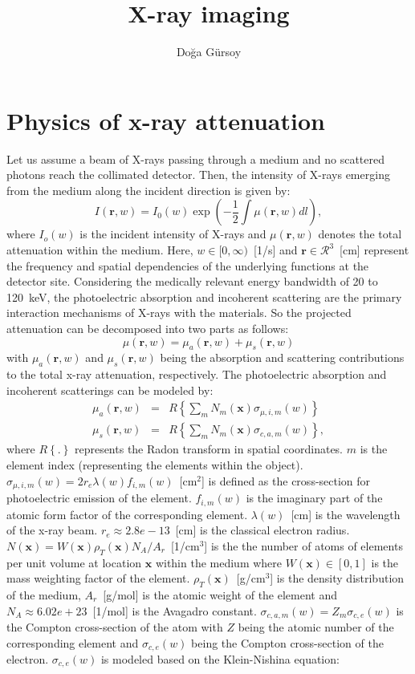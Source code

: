 \documentclass[12pt]{article}
\title{X-ray imaging}
\author{Do\u{g}a G\"{u}rsoy}
\begin{document}
\maketitle
\section{Physics of x-ray attenuation}
Let us assume a beam of X-rays passing through a medium and no scattered photons reach the collimated detector. Then, the intensity of X-rays emerging from the medium along the incident direction is given by:
\begin{equation}
 I(\textbf{r},w) = I_0(w)\exp\left(-\frac{1}{2}\int\mu(\textbf{r},w)dl\right),
 \label{intensity}
\end{equation}
where $I_o(w)$ is the incident intensity of X-rays and $\mu(\textbf{r},w)$ denotes the total attenuation within the medium. Here, $w\in[0,\infty)$~[1/s] and $\textbf{r}\in\mathcal{R}^3$~[cm] represent the frequency and spatial dependencies of the underlying functions at the detector site. Considering the medically relevant energy bandwidth of 20 to 120~keV, the photoelectric absorption and incoherent scattering are the primary interaction mechanisms of X-rays with the materials. So the projected attenuation can be decomposed into two parts as follows:
\begin{equation}
 \mu(\textbf{r},w) = \mu_{a}(\textbf{r},w)+\mu_{s}(\textbf{r},w)
 \label{attenuation}
\end{equation}
with $\mu_{a}(\textbf{r},w)$ and $\mu_{s}(\textbf{r},w)$ being the absorption and scattering contributions to the total x-ray attenuation, respectively. The photoelectric absorption and incoherent scatterings can be modeled by:
\begin{eqnarray}
 \mu_a(\textbf{r},w) &=& R\left\lbrace\sum_m N_m(\textbf{x})\sigma_{\mu,i,m}(w)\right\rbrace \label{absorption} \\
 \mu_s(\textbf{r},w) &=& R\left\lbrace\sum_m N_m(\textbf{x})\sigma_{c,a,m}(w)\right\rbrace, \label{scattering}
\end{eqnarray}
where $R\left\lbrace.\right\rbrace$ represents the Radon transform in spatial coordinates. $m$ is the element index (representing the elements within the object). $\sigma_{\mu,i,m}(w)=2r_e\lambda(w)f_{i,m}(w)$~[cm$^2$] is defined as the cross-section for photoelectric emission of the element. $f_{i,m}(w)$ is the imaginary part of the atomic form factor of the corresponding element. $\lambda(w)$~[cm] is the wavelength of the x-ray beam. $r_e\approx2.8e-13$~[cm] is the classical electron radius. $N(\textbf{x})=W(\textbf{x})\rho_{T}(\textbf{x})N_A/A_r$~[1/cm$^3$] is the the number of atoms of elements per unit volume at location $\textbf{x}$ within the medium where $W(\textbf{x})\in[0,1]$ is the mass weighting factor of the element. $\rho_{T}(\textbf{x})$~[g/cm$^3$] is the density distribution of the medium, $A_r$~[g/mol] is the atomic weight of the element and $N_A\approx6.02e+23$~[1/mol] is the Avagadro constant. $\sigma_{c,a,m}(w)=Z_m\sigma_{c,e}(w)$ is the Compton cross-section of the atom with $Z$ being the atomic number of the corresponding element and $\sigma_{c,e}(w)$ being the Compton cross-section of the electron. $\sigma_{c,e}(w)$ is modeled based on the Klein-Nishina equation:
\end{document}
